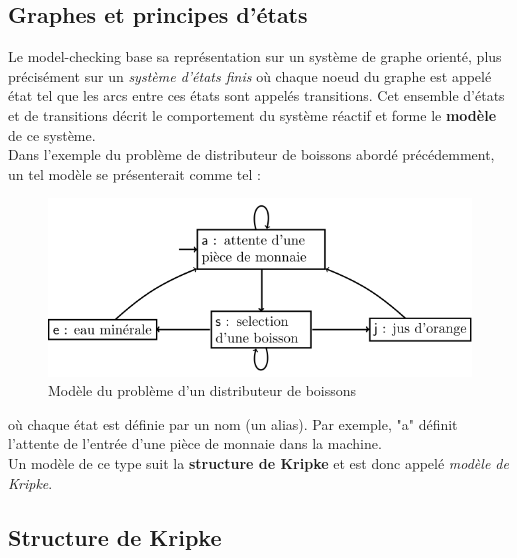 \documentclass[runningheads,a4paper,10pt]{llncs}
\begin{document}
\subsection{Graphes et principes d'états}
Le model-checking base sa représentation sur un système de graphe orienté, plus précisément sur un \textit{système d'états finis} où chaque noeud du graphe est appelé état tel que les arcs entre ces états sont appelés transitions. Cet ensemble d'états et de transitions décrit le comportement du système réactif et forme le \textbf{modèle} de ce système. \\

Dans l'exemple du problème de distributeur de boissons abordé précédemment, un tel modèle se présenterait comme tel : 

\begin{figure}
  \centering
   \includegraphics[scale=0.5]{figures/model-boissons.png}
   \caption[Caption for LOF]{Modèle du problème d'un distributeur de boissons\protect\footnotemark}
   \label{fig:model_boissons_1}
\end{figure}


\noindent
où chaque état est définie par un nom (un alias). Par exemple, "a" définit l'attente de l'entrée d'une pièce de monnaie dans la machine. \\

Un modèle de ce type suit la \textbf{structure de Kripke} et est donc appelé \textit{modèle de Kripke}. 

\newpage 

\subsection{Structure de Kripke}
\end{document}
